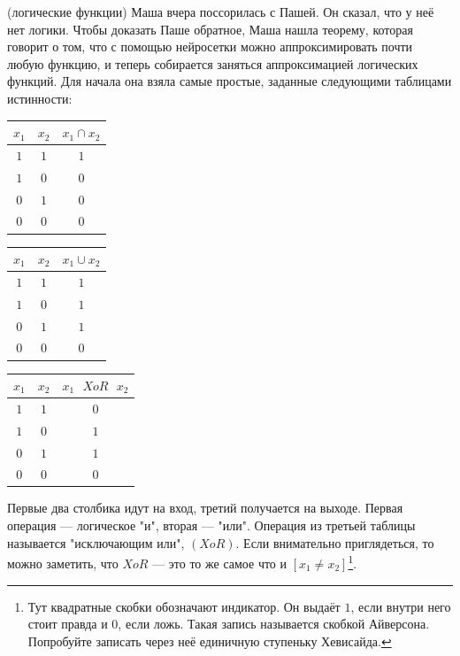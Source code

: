 \begin{problem}{(логические функции)}
Маша вчера поссорилась с Пашей. Он сказал, что у неё нет логики. Чтобы доказать Паше обратное, Маша нашла теорему, которая говорит о том, что с помощью нейросетки можно аппроксимировать почти любую функцию, и теперь собирается заняться аппроксимацией логических функций. Для начала она взяла самые простые, заданные следующими таблицами истинности:

\begin{center}
\begin{minipage}{0.3\linewidth} 
\begin{tabular}{c|c|c}
	$x_1$ & $x_2$ & $x_1 \cap x_2$ \\
	\hline 
	$1$ & $1$ & $1$ \\
	\hline 
	$1$ & $0$ & $0$ \\
	\hline 
	$0$ & $1$ & $0$ \\
	\hline 
	$0$ & $0$ & $0$ \\
\end{tabular}
\end{minipage}
\hfill
\begin{minipage}{0.3\linewidth}
		\begin{tabular}{c|c|c}
		$x_1$ & $x_2$ & $x_1 \cup x_2$ \\
		\hline 
		$1$ & $1$ & $1$ \\
		\hline 
		$1$ & $0$ & $1$ \\
		\hline 
		$0$ & $1$ & $1$ \\
		\hline 
		$0$ & $0$ & $0$ \\
	\end{tabular}
\end{minipage}
\hfill
\begin{minipage}{0.3\linewidth}
		\begin{tabular}{c|c|c}
		$x_1$ & $x_2$ & $x_1 \mbox{ } XoR \mbox{ } x_2$ \\
		\hline 
		$1$ & $1$ & $0$ \\
		\hline 
		$1$ & $0$ & $1$ \\
		\hline 
		$0$ & $1$ & $1$ \\
		\hline 
		$0$ & $0$ & $0$ \\
	\end{tabular}
\end{minipage}
\end{center}

Первые два столбика идут на вход, третий получается на выходе. Первая операция --- логическое "и", вторая --- "или".   Операция из третьей таблицы называется "исключающим или", $(XoR)$. Если внимательно приглядеться, то можно заметить, что $XoR$ --- это то же самое что и $[x_1 \ne x_2]$\footnote{Тут квадратные скобки обозначают индикатор. Он выдаёт $1$, если внутри него стоит правда и $0$, если ложь. Такая запись называется скобкой Айверсона. Попробуйте записать через неё единичную ступеньку Хевисайда.}. 
\end{problem}

